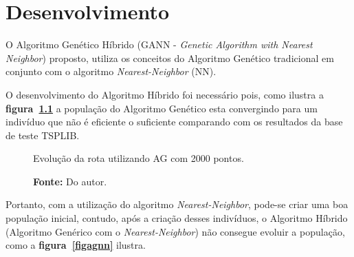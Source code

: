 \documentclass[12pt,openright,a4paper,oneside]{tcc}
\begin{document}
		\chapter{Desenvolvimento}
		
		O Algoritmo Genético Híbrido (GANN - \textit{Genetic Algorithm with Nearest Neighbor}) proposto, utiliza os conceitos do Algoritmo Genético tradicional em conjunto com o algoritmo  \textit{Nearest-Neighbor} (NN).

		O desenvolvimento do Algoritmo Híbrido foi necessário pois, como ilustra a \textbf{figura~\ref{graf-agestag}}  a população do Algoritmo Genético esta convergindo para um indivíduo que não é eficiente o suficiente comparando com os resultados da base de teste TSPLIB.  

		\begin{figure}[h]
			\centering
            \caption{Evolução da rota utilizando AG com 2000 pontos.}
            \caption*{\textbf{Fonte:} Do autor.}
			\label{graf-agestag}
		\end{figure}

		Portanto, com a utilização do algoritmo \textit{Nearest-Neighbor}, pode-se criar uma boa população inicial, contudo, após a criação desses indivíduos, o Algoritmo Híbrido (Algoritmo Genérico com o  \textit{Nearest-Neighbor}) não consegue evoluir a população, como a \textbf{figura~\ref{figagnn}} ilustra.  
\end{document}
